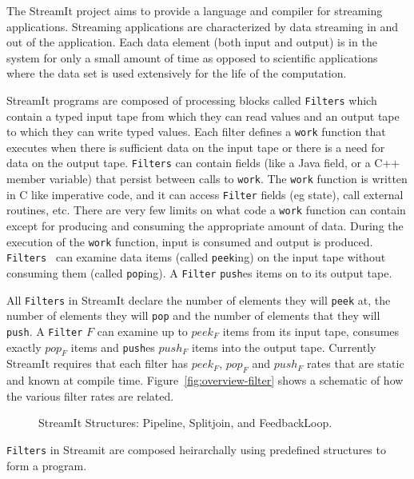 The StreamIt\cite{thies02streamit,thies01streamit,william-stream,michal-common} project
aims to provide a language and compiler for streaming applications. Streaming applications 
are characterized by data streaming in and out of the application. Each data element (both
input and output) is in the system for only a small amount of time as opposed to scientific
applications where the data set is used extensively for the life of the computation.
 
StreamIt programs are composed of processing blocks called {\tt Filters} which
contain a typed input tape from which they can read values and an output tape to which
they can write typed values. Each filter defines a {\tt work} function that executes when there
is sufficient data on the input tape or there is a need for data on the output tape.
{\tt Filters} can contain fields (like a Java field, or a C++ member variable) that
persist between calls to {\tt work}. The {\tt work} function is written in C like imperative code, 
and it can access {\tt Filter} fields (eg state), call external routines, etc.
There are very few limits on what code a {\tt work} function can contain except for
producing and consuming the appropriate amount of data.  
During the execution of the {\tt work} function, input is consumed and output is produced.
{\tt Filters } can examine data items (called {\tt peek}ing) on the input tape without
consuming them (called {\tt pop}ing). A {\tt Filter} {\tt push}es items on to its output tape.

All {\tt Filters} in StreamIt declare the number of elements they
will {\tt peek} at, the number of elements they will {\tt pop} and the number
of elements that they will {\tt push}. A {\tt Filter} $F$ can examine up to $peek_{F}$ 
items from its input tape, consumes exactly $pop_{F}$ items and {\tt push}es 
$push_{F}$ items into the output tape. Currently StreamIt requires that each filter has 
$peek_F$, $pop_F$ and $push_F$ rates that are static and known at compile time. 
Figure~\ref{fig:overview-filter} shows a schematic of how the various filter rates are related.

\begin{figure}
\center
\epsfxsize=3.0in
\caption{StreamIt Structures: Pipeline, Splitjoin, and FeedbackLoop.}
\label{fig:structures}
\end{figure}

{\tt Filters} in Streamit are composed heirarchally using predefined structures to form
a program. 

